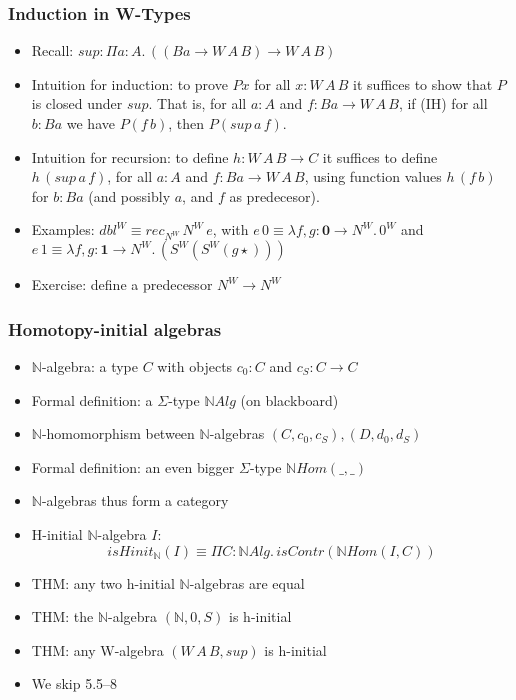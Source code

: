 \documentclass[handout]{beamer}
\newcommand{\depi}[3]{\Pi{#1{:}#2.\,#3}}
\newcommand{\lamt}[3]{\lambda{#1{:}#2.\,#3}}
\newcommand{\Nat}{\mathbb{N}}
\newcommand{\bfnull}{\mathbf{0}}
\newcommand{\bfone}{\mathbf{1}}
\begin{document}
\frame
  {
    \frametitle{Induction in W-Types}

    \begin{itemize}[<+->]
    \item Recall: $sup:\depi{a}{A}{((Ba\to W\,A\,B)\to W\,A\,B)}$
    \item Intuition for induction: to prove $Px$ for all $x:W\,A\,B$ it suffices
             to show that $P$ is closed under $sup$. 
             That is, for all $a:A$ and $f:Ba\to W\,A\,B$, 
             if (IH) for all $b:Ba$ we have $P(f\,b)$, 
             then $P(sup\,a\,f)$.
    \item Intuition for recursion: to define $h: W\,A\,B \to C$ 
             it suffices to define $h\,(sup\,a\,f)$, 
             for all $a:A$ and $f:Ba \to W\,A\,B$,
             using function values $h\,(f\,b)$ for $b:Ba$
             (and possibly $a$, and $f$ as predecesor).
    \item Examples: $dbl^W \equiv rec_{N^W}\,N^W\,e$, with
             $e\,0 \equiv \lamt{{f,g}}{\bfnull{\to} N^W}{0^W}$   
             and $e\,1 \equiv \lamt{{f,g}}{\bfone{\to} N^W}{(S^W(S^W (g\star) ))}$
    \item Exercise: define a predecessor $N^W \to N^W$         
    \end{itemize}
  }      
 
 
 \frame
  {
    \frametitle{Homotopy-initial algebras}

    \begin{itemize}[<+->]
    \item $\Nat$-algebra: a type $C$ with objects $c_0:C$ and $c_S: C\to C$
    \item Formal definition: a $\Sigma$-type $\Nat Alg$ (on blackboard)
    \item $\Nat$-homomorphism between $\Nat$-algebras $(C,c_0,c_S),(D,d_0,d_S)$
    \item Formal definition: an even bigger $\Sigma$-type $\Nat Hom(\_,\_)$
    \item $\Nat$-algebras thus form a category
    \item H-initial $\Nat$-algebra $I$: 
    \[isHinit_{\Nat}(I) \equiv \depi{C}{\Nat Alg}{isContr(\Nat Hom(I,C))}\]
    \item THM: any two h-initial $\Nat$-algebras are equal
    \item THM: the $\Nat$-algebra $(\Nat,0,S)$ is h-initial
    \item THM: any W-algebra $(W\,A\,B,sup)$ is h-initial
    \item We skip 5.5--8
    \end{itemize}
  }      
\end{document}
